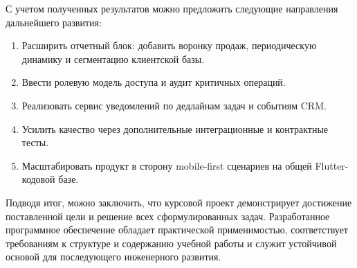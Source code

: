 С учетом полученных результатов можно предложить следующие направления дальнейшего развития:
\begin{enumerate}
  \item Расширить отчетный блок: добавить воронку продаж, периодическую динамику и сегментацию клиентской базы.
  \item Ввести ролевую модель доступа и аудит критичных операций.
  \item Реализовать сервис уведомлений по дедлайнам задач и событиям CRM.
  \item Усилить качество через дополнительные интеграционные и контрактные тесты.
  \item Масштабировать продукт в сторону mobile-first сценариев на общей Flutter-кодовой базе.
\end{enumerate}

Подводя итог, можно заключить, что курсовой проект демонстрирует достижение поставленной цели и решение всех сформулированных задач. Разработанное программное обеспечение обладает практической применимостью, соответствует требованиям к структуре и содержанию учебной работы и служит устойчивой основой для последующего инженерного развития.
